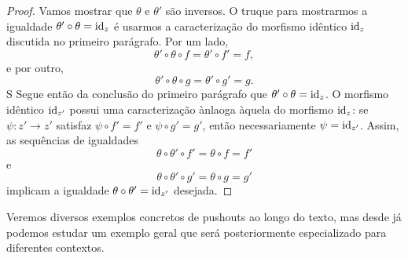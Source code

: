 \begin{proof}
    Vamos mostrar que $\theta$ e $\theta'$ são inversos.
    O truque para mostrarmos a igualdade $\theta' \circ \theta = \mathrm{id}_z$ é usarmos a caracterização do morfismo idêntico $\mathrm{id}_z$ discutida no primeiro parágrafo.
    Por um lado,
    \begin{displaymath}
        \theta' \circ \theta \circ f
        = \theta' \circ f' = f,
    \end{displaymath}
    e por outro,
    \begin{displaymath}
        \theta' \circ \theta \circ g
        = \theta' \circ g'
        = g.
    \end{displaymath}S
    Segue então da conclusão do primeiro parágrafo que $\theta' \circ \theta = \mathrm{id}_z$.
    O morfismo idêntico $\mathrm{id}_{z'}$ possui uma caracterização ànlaoga àquela do morfismo $\mathrm{id}_z$: se $\psi: z' \to z'$ satisfaz $\psi \circ f' = f'$ e $\psi \circ g' = g'$, então necessariamente $\psi = \mathrm{id}_{z'}$.
    Assim, as sequências de igualdades
    \begin{displaymath}
        \theta \circ \theta' \circ f'
        = \theta \circ f
        = f'
    \end{displaymath}
    e
    \begin{displaymath}
        \theta \circ \theta' \circ g'
        = \theta \circ g
        = g'
    \end{displaymath}
    implicam a igualdade $\theta \circ \theta' = \mathrm{id}_{z'}$ desejada.
\end{proof}

Veremos diversos exemplos concretos de pushouts ao longo do texto, mas desde já podemos estudar um exemplo geral que será posteriormente especializado para diferentes contextos.

